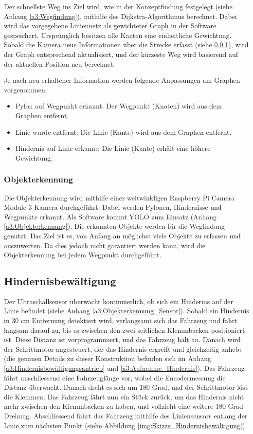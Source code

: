 \documentclass[../main.tex]{subfiles}
\begin{document}
Der schnellste Weg ins Ziel wird, wie in der Konzeptfindung festgelegt (siehe Anhang \ref{a3:Wegfindung}), mithilfe des Dijkstra-Algorithmus berechnet. Dabei wird das vorgegebene Liniennetz als gewichteter Graph in der Software gespeichert. Ursprünglich besitzen alle Kanten eine einheitliche Gewichtung. Sobald die Kamera neue Informationen über die Strecke erfasst (siehe \ref{sub:Objekterkennung}), wird der Graph entsprechend aktualisiert, und der kürzeste Weg wird basierend auf der aktuellen Position neu berechnet.

Je nach neu erhaltener Information werden folgende Anpassungen am Graphen vorgenommen: \begin{itemize} 
  \item Pylon auf Wegpunkt erkannt: Der Wegpunkt (Knoten) wird aus dem Graphen entfernt.
  \item Linie wurde entfernt: Die Linie (Kante) wird aus dem Graphen entfernt. 
  \item Hindernis auf Linie erkannt: Die Linie (Kante) erhält eine höhere Gewichtung.
\end{itemize}

\subsubsection{Objekterkennung} \label{sub:Objekterkennung}
Die Objekterkennung wird mithilfe einer weitwinkligen Raspberry Pi Camera Module 3 Kamera durchgeführt. Dabei werden Pylonen, Hindernisse und Wegpunkte erkannt. Als Software kommt YOLO zum Einsatz (Anhang \ref{a3:Objekterkennung}). Die erkannten Objekte werden für die Wegfindung genutzt. Das Ziel ist es, von Anfang an möglichst viele Objekte zu erfassen und auszuwerten. Da dies jedoch nicht garantiert werden kann, wird die Objekterkennung bei jedem Wegpunkt durchgeführt. 

\subsection{Hindernisbewältigung}
Der Ultraschallsensor überwacht kontinuierlich, ob sich ein Hindernis auf der Linie befindet (siehe Anhang \ref{a3:Objekterkennung_Sensor}). Sobald ein Hindernis in 30 cm Entfernung detektiert wird, verlangsamt sich das Fahrzeug und fährt langsam darauf zu, bis es zwischen den zwei seitlichen Klemmbacken positioniert ist. Diese Distanz ist vorprogrammiert, und das Fahrzeug hält an. Danach wird der Schrittmotor angesteuert, der das Hindernis ergreift und gleichzeitig anhebt (die genauen Details zu dieser Konstruktion befinden sich im Anhang \ref{a3:Hindernisbewältigungsantrieb} und \ref{a3:Aufnahme_Hindernis}).
Das Fahrzeug fährt anschliessend eine Fahrzeuglänge vor, wobei die Encodermessung die Distanz überwacht. Danach dreht es sich um 180 Grad, und der Schrittmotor löst die Klemmen. Das Fahrzeug fährt nun ein Stück zurück, um das Hindernis nicht mehr zwischen den Klemmbacken zu haben, und vollzieht eine weitere 180-Grad-Drehung. Abschliessend fährt das Fahrzeug mithilfe des Liniensensors entlang der Linie zum nächsten Punkt (siehe Abbildung \ref{img:Skizze_Hindernisbewältigung}).
\end{document}
